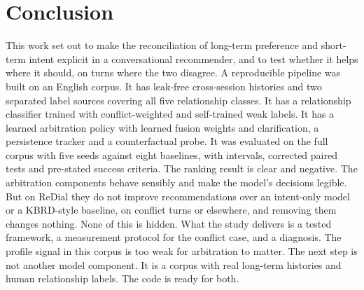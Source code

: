 \section{Conclusion}
This work set out to make the reconciliation of long-term preference and short-term intent explicit in a conversational recommender, and to test whether it helps where it should, on turns where the two disagree. A reproducible pipeline was built on an English corpus. It has leak-free cross-session histories and two separated label sources covering all five relationship classes. It has a relationship classifier trained with conflict-weighted and self-trained weak labels. It has a learned arbitration policy with learned fusion weights and clarification, a persistence tracker and a counterfactual probe. It was evaluated on the full corpus with five seeds against eight baselines, with intervals, corrected paired tests and pre-stated success criteria. The ranking result is clear and negative. The arbitration components behave sensibly and make the model's decisions legible. But on ReDial they do not improve recommendations over an intent-only model or a KBRD-style baseline, on conflict turns or elsewhere, and removing them changes nothing. None of this is hidden. What the study delivers is a tested framework, a measurement protocol for the conflict case, and a diagnosis. The profile signal in this corpus is too weak for arbitration to matter. The next step is not another model component. It is a corpus with real long-term histories and human relationship labels. The code is ready for both.

\ifdefined\balance\makeatletter\if@twocolumn\balance\fi\makeatother\fi
